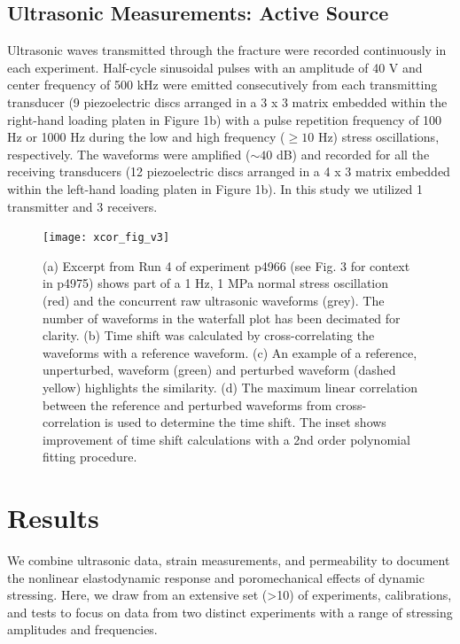 \documentclass[draft]{agujournal2019}
\begin{document}
\subsection{Ultrasonic Measurements: Active Source}
Ultrasonic waves transmitted through the fracture were recorded continuously in each experiment. Half-cycle sinusoidal pulses with an amplitude of 40 V and center frequency of 500 kHz were emitted consecutively from each transmitting transducer (9 piezoelectric discs arranged in a 3 x 3 matrix embedded within the right-hand loading platen in Figure 1b) with a pulse repetition frequency of 100 Hz or 1000 Hz during the low and high frequency ($\geq 10$ Hz) stress oscillations, respectively. The waveforms were amplified ($\sim 40$ dB) and recorded for all the receiving transducers (12 piezoelectric discs arranged in a 4 x 3 matrix embedded within the left-hand loading platen in Figure 1b). In this study we utilized 1 transmitter and 3 receivers. 

\newpage

\begin{figure}[ht]
	\centering
	\texttt{[image: xcor\_fig\_v3]}
	\caption[]{(a) Excerpt from Run 4 of experiment p4966 (see Fig. 3 for context in p4975) shows part of a 1 Hz, 1 MPa normal stress oscillation (red) and the concurrent raw ultrasonic waveforms (grey). The number of waveforms in the waterfall plot has been decimated for clarity. (b) Time shift was calculated by cross-correlating the waveforms with a reference waveform. (c) An example of a reference, unperturbed, waveform (green) and perturbed waveform (dashed yellow) highlights the similarity. (d) The maximum linear correlation between the reference and perturbed waveforms from cross-correlation is used to determine the time shift. The inset shows improvement of time shift calculations with a 2nd order polynomial fitting procedure.}
	\label{fig:xcor_poly}
\end{figure}

\newpage




\section{Results}

We combine ultrasonic data, strain measurements, and permeability to document the nonlinear elastodynamic response and poromechanical effects of dynamic stressing. Here, we draw from an extensive set (>10) of experiments, calibrations, and tests to focus on data from two distinct experiments with a range of stressing amplitudes and frequencies.
\end{document}
